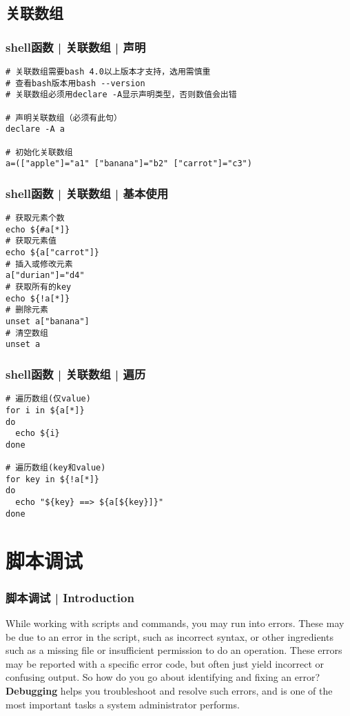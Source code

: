 \subsection{关联数组}
\begin{frame}[fragile]
  \frametitle{shell函数 | 关联数组 | 声明}
\begin{lstlisting}
# 关联数组需要bash 4.0以上版本才支持，选用需慎重
# 查看bash版本用bash --version
# 关联数组必须用declare -A显示声明类型，否则数值会出错

# 声明关联数组（必须有此句）
declare -A a 

# 初始化关联数组
a=(["apple"]="a1" ["banana"]="b2" ["carrot"]="c3")
\end{lstlisting}
\end{frame}

\begin{frame}[fragile]
  \frametitle{shell函数 | 关联数组 | 基本使用}
\begin{lstlisting}
# 获取元素个数
echo ${#a[*]}
# 获取元素值
echo ${a["carrot"]}
# 插入或修改元素
a["durian"]="d4"
# 获取所有的key
echo ${!a[*]}
# 删除元素
unset a["banana"]
# 清空数组
unset a
\end{lstlisting}
\end{frame}

\begin{frame}[fragile]
  \frametitle{shell函数 | 关联数组 | 遍历}
\begin{lstlisting}
# 遍历数组(仅value)
for i in ${a[*]}
do
  echo ${i}
done

# 遍历数组(key和value)
for key in ${!a[*]}
do
  echo "${key} ==> ${a[${key}]}"
done
\end{lstlisting}
\end{frame}

\section{脚本调试}
\begin{frame}
  \frametitle{脚本调试 | Introduction}
  While working with scripts and commands, you may run into errors.  These may be due to an error in the script, such as incorrect syntax, or other ingredients such as a missing file or insufficient permission to do an operation. These errors may be reported with a specific error code, but often just yield incorrect or confusing output. So how do you go about identifying and fixing an error?\\
  \vspace{0.3cm}
  \textbf{Debugging} helps you troubleshoot and resolve such errors, and is one of the most important tasks a system administrator performs.
\end{frame}

